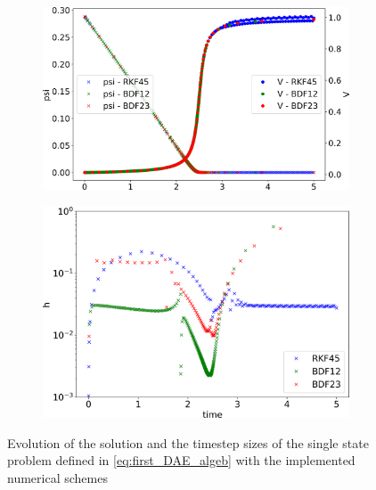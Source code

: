 \begin{figure}[H]
    \centering
    \begin{subfigure}{0.43\textwidth}
    	\centering
    	\includegraphics[width=1\textwidth]{images/timeEvolutionValues.png}
        \label{fig:timeEvolutionValues}
    \end{subfigure}
    \begin{subfigure}{0.43\textwidth}
    	\centering
    	\includegraphics[width=1\textwidth]{images/timeEvolutionDT.png}
        \label{fig:timeEvolutionDT}
    \end{subfigure}
    \caption{Evolution of the solution and the timestep sizes of the single state problem defined in \autoref{eq:first_DAE_algeb} with the implemented numerical schemes}
\end{figure}

